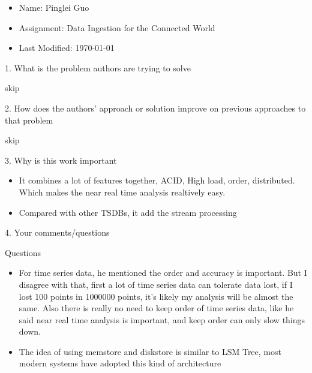 \documentclass[12pt,a4paper,oneside]{article}
\begin{document}
\begin{itemize}
  \item Name: Pinglei Guo
  \item Assignment: Data Ingestion for the Connected World
  \item Last Modified: \today
\end{itemize}

1. What is the problem authors are trying to solve

\medskip

skip

\bigskip

2. How does the authors’ approach or solution improve on previous approaches to that problem

\medskip

skip

\bigskip

3. Why is this work important

\medskip

\begin{itemize}
  \item It combines a lot of features together, ACID, High load, order, distributed.
  Which makes the near real time analysis realtively easy.
  \item Compared with other TSDBs, it add the stream processing
\end{itemize}

\bigskip

4. Your comments/questions

\medskip

Questions

\begin{itemize}
  \item For time series data, he mentioned the order and accuracy is important.
  But I disagree with that, first a lot of time series data can tolerate data lost, if
  I lost 100 points in 1000000 points, it's likely my analysis will be almost the same.
  Also there is really no need to keep order of time series data, like he said near real time
  analysis is important, and keep order can only slow things down.
  \item The idea of using memstore and diskstore is similar to LSM Tree, most modern
  systems have adopted this kind of architecture
\end{itemize}
\end{document}
